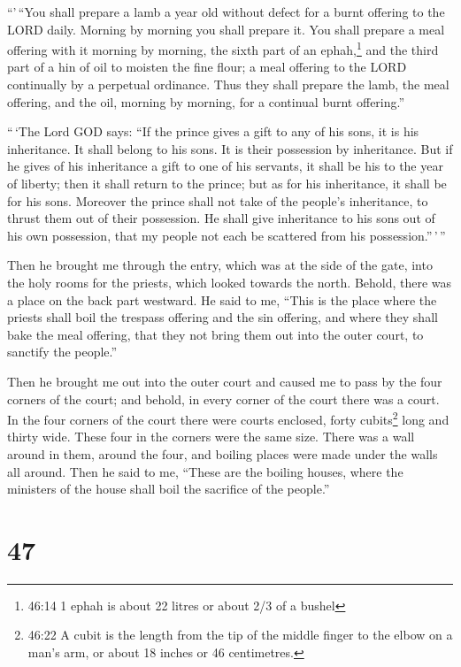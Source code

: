  ``'\,``You shall prepare a lamb a year old without defect
for a burnt offering to the LORD daily. Morning by morning you shall
prepare it.  You shall prepare a meal offering with it
morning by morning, the sixth part of an ephah,\footnote{46:14 1 ephah
  is about 22 litres or about 2/3 of a bushel} and the third part of a
hin of oil to moisten the fine flour; a meal offering to the LORD
continually by a perpetual ordinance.  Thus they shall
prepare the lamb, the meal offering, and the oil, morning by morning,
for a continual burnt offering.''

 ``\,`The Lord GOD says: ``If the prince gives a gift to
any of his sons, it is his inheritance. It shall belong to his sons. It
is their possession by inheritance.  But if he gives of his
inheritance a gift to one of his servants, it shall be his to the year
of liberty; then it shall return to the prince; but as for his
inheritance, it shall be for his sons.  Moreover the prince
shall not take of the people's inheritance, to thrust them out of their
possession. He shall give inheritance to his sons out of his own
possession, that my people not each be scattered from his
possession.''\,'\,''

 Then he brought me through the entry, which was at the
side of the gate, into the holy rooms for the priests, which looked
towards the north. Behold, there was a place on the back part westward.
 He said to me, ``This is the place where the priests shall
boil the trespass offering and the sin offering, and where they shall
bake the meal offering, that they not bring them out into the outer
court, to sanctify the people.''

 Then he brought me out into the outer court and caused me
to pass by the four corners of the court; and behold, in every corner of
the court there was a court.  In the four corners of the
court there were courts enclosed, forty cubits\footnote{46:22 A cubit is
  the length from the tip of the middle finger to the elbow on a man's
  arm, or about 18 inches or 46 centimetres.} long and thirty wide.
These four in the corners were the same size.  There was a
wall around in them, around the four, and boiling places were made under
the walls all around.  Then he said to me, ``These are the
boiling houses, where the ministers of the house shall boil the
sacrifice of the people.''

\hypertarget{section-45}{%
\section{47}\label{section-45}}

